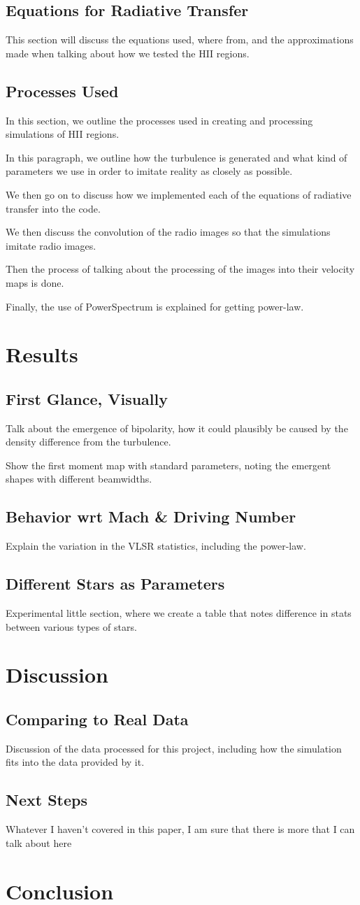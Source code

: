 \documentclass{article}
\begin{document}
\subsection{Equations for Radiative Transfer}
This section will discuss the equations used, where from, and the approximations made when talking about how we tested the HII regions.
\subsection{Processes Used}
In this section, we outline the processes used in creating and processing simulations of HII regions.

In this paragraph, we outline how the turbulence is generated and what kind of parameters we use in order to imitate reality as closely as possible.

We then go on to discuss how we implemented each of the equations of radiative transfer into the code.

We then discuss the convolution of the radio images so that the simulations imitate radio images.

Then the process of talking about the processing of the images into their velocity maps is done.

Finally, the use of PowerSpectrum is explained for getting power-law.
\section{Results}
\subsection{First Glance, Visually}
Talk about the emergence of bipolarity, how it could plausibly be caused by the density difference from the turbulence.

Show the first moment map with standard parameters, noting the emergent shapes with different beamwidths.
\subsection{Behavior wrt Mach \& Driving Number}
Explain the variation in the VLSR statistics, including the power-law.
\subsection{Different Stars as Parameters}
Experimental little section, where we create a table that notes difference in stats between various types of stars.
\section{Discussion}
\subsection{Comparing to Real Data}
Discussion of the data processed for this project, including how the simulation fits into the data provided by it.
\subsection{Next Steps}
Whatever I haven't covered in this paper, I am sure that there is more that I can talk about here
\section{Conclusion}
\end{document}

